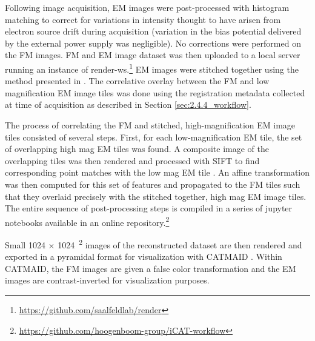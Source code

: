 Following image acquisition, EM images were post-processed with histogram matching to correct for variations in intensity thought to have arisen from electron source drift during acquisition (variation in the bias potential delivered by the external power supply was negligible). No corrections were performed on the FM images. FM and EM image dataset was then uploaded to a local server running an instance of render-ws.\footnote{\href{https://github.com/saalfeldlab/render}{https://github.com/saalfeldlab/render}} EM images were stitched together using the method presented in \textcite{khairy2018joint}. The correlative overlay between the FM and low magnification EM image tiles was done using the registration metadata collected at time of acquisition as described in Section \ref{sec:2.4.4_workflow}.

The process of correlating the FM and stitched, high-magnification EM image tiles consisted of several steps. First, for each low-magnification EM tile, the set of overlapping high mag EM tiles was found. A composite image of the overlapping tiles was then rendered and processed with SIFT to find corresponding point matches with the low mag EM tile \cite{lowe1999object}. An affine transformation was then computed for this set of features and propagated to the FM tiles such that they overlaid precisely with the stitched together, high mag EM image tiles. The entire sequence of post-processing steps is compiled in a series of jupyter notebooks available in an online repository.\footnote{\href{https://github.com/hoogenboom-group/iCAT-workflow}{https://github.com/hoogenboom-group/iCAT-workflow}}

Small 1024 $\times$ \SI{1024}{\pixel^2} images of the reconstructed dataset are then rendered and exported in a pyramidal format for visualization with CATMAID \cite{saalfeld2009catmaid}. Within CATMAID, the FM images are given a false color transformation and the EM images are contrast-inverted for visualization purposes.
